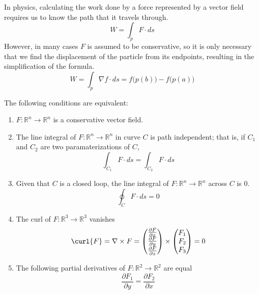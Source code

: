   In physics, calculating the work done by a force represented by a vector field requires us to know the path that it travels through. 
	\begin{equation}
  	W = \int_p F \cdot ds
	\end{equation}
  However, in many cases $F$ is assumed to be conservative, so it is only necessary that we find the displacement of the particle from its endpoints, resulting in the simplification of the formula.  
	\begin{equation}
  	W = \int_p \nabla f \cdot ds = f\big( p(b)\big) - f \big(p(a)\big)
	\end{equation}

  \begin{corollary}
		The following conditions are equivalent: 
		\begin{enumerate}
			\item $F: \mathbb{R}^n \longrightarrow \mathbb{R}^n$ is a conservative vector field. 
			\item The line integral of $F: \mathbb{R}^n \longrightarrow \mathbb{R}^n$ in curve $C$ is path independent; that is, if $C_1$ and $C_2$ are two paramaterizations of $C$, 
			\[\int_{C_1} F \cdot ds = \int_{C_2} F \cdot ds\]
			\item Given that $C$ is a closed loop, the line integral of $F: \mathbb{R}^n \longrightarrow \mathbb{R}^n$ across $C$ is $0$. 
			\[\oint_C F \cdot ds = 0\]
			\item The curl of $F: \mathbb{R}^3 \longrightarrow \mathbb{R}^3$ vanishes
			\[\curl{F} = \nabla \times F = \begin{pmatrix}
			\frac{\partial F}{\partial x} \\\frac{\partial F}{\partial y} \\\frac{\partial F}{\partial z} 
			\end{pmatrix} \times \begin{pmatrix}
			F_1\\F_2\\F_3
			\end{pmatrix}= 0\]
			\item The following partial derivatives of $F: \mathbb{R}^2 \longrightarrow \mathbb{R}^2$ are equal
			\[\frac{\partial F_1}{\partial y} = \frac{\partial F_2}{\partial x}\]
		\end{enumerate}
  \end{corollary}

